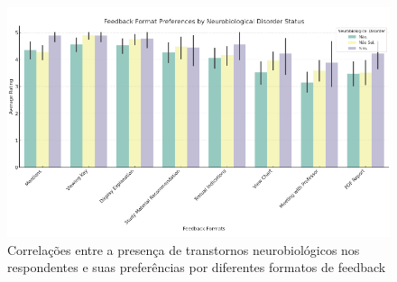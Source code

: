 \begin{figure}[!h]
\centering
\includegraphics{figuras/neurological_graphic.png}
\caption{Correlações entre a presença de transtornos neurobiológicos nos respondentes e suas preferências por diferentes formatos de feedback}
\end{figure}

